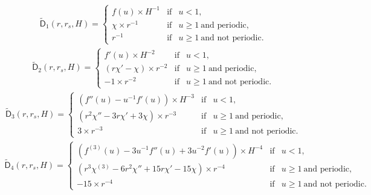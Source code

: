 \begin{align}
  \mathsf{\tilde{D}}_{1}(r, r_s, H) = %
  \left\lbrace\begin{array}{rcl}
  f(u)\times  H^{-1} & \mbox{if} & u < 1,\\
  \chi \times r^{-1} & \mbox{if} & u \geq 1~\mbox{and periodic}, \\
  r^{-1} & \mbox{if} & u \geq 1~\mbox{and not periodic}. 
  \end{array}
  \right.\nonumber
\end{align}
\begin{align}
  \mathsf{\tilde{D}}_{2}(r, r_s, H) = %
  \left\lbrace\begin{array}{rcl}
  f'(u)\times  H^{-2}& \mbox{if} & u < 1,\\
  \left(r\chi' - \chi\right) \times r^{-2} & \mbox{if} & u \geq 1~\mbox{and periodic}, \\
  -1 \times r^{-2} & \mbox{if} & u \geq 1~\mbox{and not periodic}. 
  \end{array}
  \right.\nonumber
\end{align}
\begin{align} 
  \mathsf{\tilde{D}}_{3}(r, r_s, H) =  %
  \left\lbrace\begin{array}{rcl}
  \left(f''(u) - u^{-1}f'(u)\right)\times  H^{-3}& \mbox{if} & u < 1,\\
  \left(r^2\chi'' - 3r\chi' + 3\chi \right)\times r^{-3} & \mbox{if} & u \geq 1~\mbox{and periodic}, \\
  3 \times  r^{-3} & \mbox{if} & u \geq 1~\mbox{and not periodic}. 
  \end{array}
  \right.\nonumber
\end{align}
\begin{align}
  \mathsf{\tilde{D}}_{4}(r, r_s, H) = %
  \left\lbrace\begin{array}{rcl}
  \left(f^{(3)}(u)-3u^{-1}f''(u)+3u^{-2}f'(u)\right)\times  H^{-4} & \mbox{if} & u < 1,\\
  \left(r^3\chi^{(3)} - 6r^2\chi''+15r\chi'-15\chi\right) \times r^{-4} & \mbox{if} & u \geq 1~\mbox{and periodic}, \\
  -15 \times r^{-4} & \mbox{if} & u \geq 1~\mbox{and not periodic}. 
  \end{array}
  \right.\nonumber
\end{align}
